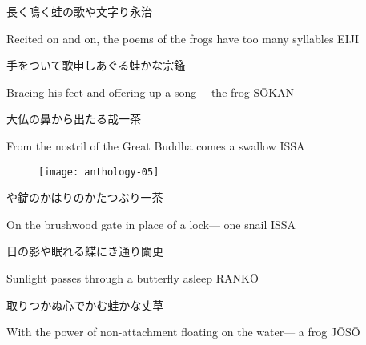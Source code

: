 \begin{haiku}
    {\FH 長く鳴く蛙の歌や文字り}\hfill{\FH 永治}

    \vin{} Recited on and on,
    \vin{} \vin{} the poems of the frogs
    \vin{} \vin{} \vin{} have too many syllables \hspace{\fill} EIJI
\end{haiku}

\begin{haiku}
    {\FH 手をついて歌申しあぐる蛙かな}\hfill{\FH 宗鑑}

    \vin{} Bracing his feet
    \vin{} \vin{} and offering up a song---
    \vin{} \vin{} \vin{} the frog \hspace{\fill} S\={O}KAN
\end{haiku}

\begin{haiku}
    {\FH 大仏の鼻から出たる哉}\hfill{\FH 一茶}

    \vin{} From the nostril
    \vin{} \vin{} of the Great Buddha comes
    \vin{} \vin{} \vin{} a swallow \hspace{\fill} ISSA
\end{haiku}

\begin{figure}
    \texttt{[image: anthology-05]}
\end{figure}

\begin{haiku}
    {\FH {}や錠のかはりのかたつぶり}\hfill{\FH 一茶}

    \vin{} On the brushwood gate
    \vin{} \vin{} in place of a lock---
    \vin{} \vin{} \vin{} one snail \hspace{\fill} ISSA
\end{haiku}

\begin{haiku}
    {\FH 日の影や眠れる蝶にき通り}\hfill{\FH 闌更}

    \vin{} Sunlight
    \vin{} \vin{} passes through a butterfly
    \vin{} \vin{} \vin{} asleep \hspace{\fill} RANK\={O}
\end{haiku}

\begin{haiku}
    {\FH 取りつかぬ心でかむ蛙かな}\hfill{\FH 丈草}

    \vin{} With the power of non-attachment
    \vin{} \vin{} floating on the water---
    \vin{} \vin{} \vin{} a frog \hspace{\fill} J\={O}S\={O}
\end{haiku}

